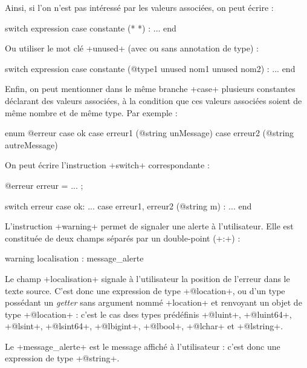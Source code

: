 Ainsi, si l'on n'est pas intéressé par les valeurs associées, on peut écrire :
\begin{galgas}
switch expression
case constante (* *) :
...
end
\end{galgas}


Ou utiliser le mot clé \ggs+unused+ (avec ou sans annotation de type) :
\begin{galgas}
switch expression
case constante (@type1 unused nom1 unused nom2) :
...
end
\end{galgas}


Enfin, on peut mentionner dans le même branche \ggs+case+ plusieurs constantes déclarant des valeurs associées, à la condition que ces valeurs associées soient de même nombre et de même type. Par exemple :

\begin{galgas}
enum @erreur {
  case ok
  case erreur1 (@string unMessage)
  case erreur2 (@string autreMessage) 
}
\end{galgas}

On peut écrire l'instruction \ggs+switch+ correspondante :
\begin{galgas}
@erreur erreur = ... ;

switch erreur
case ok:
  ...
case erreur1, erreur2 (@string m) :
  ...
end
\end{galgas}





L'instruction \ggs+warning+ permet de signaler une alerte à l'utilisateur. Elle est constituée de deux champs séparés par un double-point (\ggs+:+) :

\begin{galgas}
warning localisation : message_alerte
\end{galgas}



Le champ \ggs+localisation+ signale à l'utilisateur la position de l'erreur dans le texte source. C'est donc une expression de type \ggs+@location+, ou d'un type possédant un \emph{getter} sans argument nommé \ggs+location+ et renvoyant un objet de type \ggs+@location+ : c'est le cas dses types prédéfinis \ggs+@luint+, \ggs+@luint64+, \ggs+@lsint+, \ggs+@lsint64+, \ggs+@lbigint+, \ggs+@lbool+, \ggs+@lchar+ et \ggs+@lstring+.


Le \ggs+message_alerte+ est le message affiché à l'utilisateur : c'est donc une expression de type \ggs+@string+.

